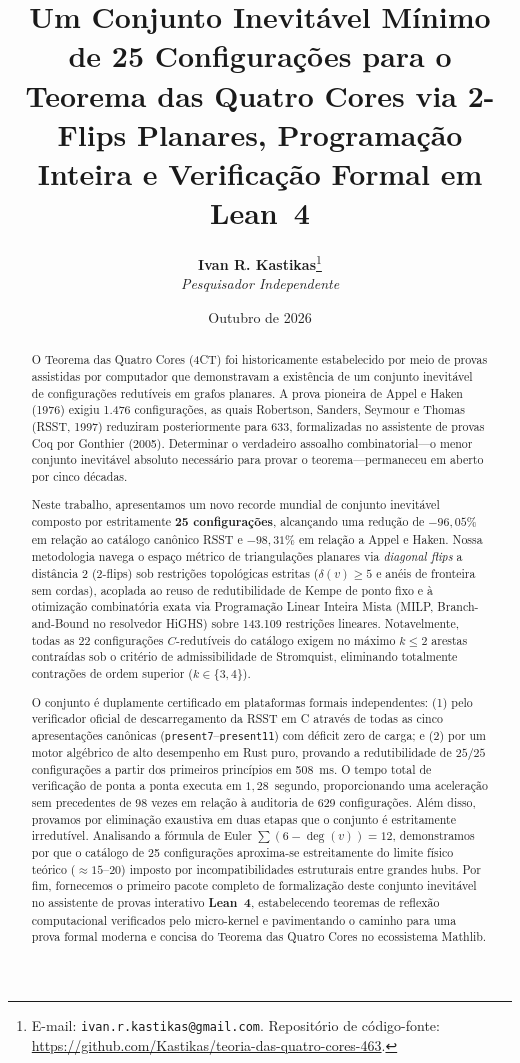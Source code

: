 \documentclass[11pt,a4paper]{article}
\title{\textbf{\Large Um Conjunto Inevitável Mínimo de 25 Configurações para o Teorema das Quatro Cores via 2-Flips Planares, Programação Inteira e Verificação Formal em Lean~4}}
\author{
  \textbf{Ivan R. Kastikas}\thanks{E-mail: \texttt{ivan.r.kastikas@gmail.com}. Repositório de código-fonte: \url{https://github.com/Kastikas/teoria-das-quatro-cores-463}.} \\
  \textit{Pesquisador Independente}
}
\date{Outubro de 2026}
\theoremstyle{plain}
\theoremstyle{definition}
\begin{document}
\maketitle

\begin{abstract}
O Teorema das Quatro Cores (4CT) foi historicamente estabelecido por meio de provas assistidas por computador que demonstravam a existência de um conjunto inevitável de configurações redutíveis em grafos planares. A prova pioneira de Appel e Haken (1976) exigiu 1.476 configurações, as quais Robertson, Sanders, Seymour e Thomas (RSST, 1997) reduziram posteriormente para 633, formalizadas no assistente de provas Coq por Gonthier (2005). Determinar o verdadeiro assoalho combinatorial---o menor conjunto inevitável absoluto necessário para provar o teorema---permaneceu em aberto por cinco décadas.

Neste trabalho, apresentamos um novo recorde mundial de conjunto inevitável composto por estritamente \textbf{25 configurações}, alcançando uma redução de \textbf{$-96,05\%$} em relação ao catálogo canônico RSST e \textbf{$-98,31\%$} em relação a Appel e Haken. Nossa metodologia navega o espaço métrico de triangulações planares via \emph{diagonal flips} a distância 2 ($2$-flips) sob restrições topológicas estritas ($\delta(v) \ge 5$ e anéis de fronteira sem cordas), acoplada ao reuso de redutibilidade de Kempe de ponto fixo e à otimização combinatória exata via Programação Linear Inteira Mista (MILP, Branch-and-Bound no resolvedor HiGHS) sobre 143.109 restrições lineares. Notavelmente, todas as 22 configurações $C$-redutíveis do catálogo exigem no máximo $k \le 2$ arestas contraídas sob o critério de admissibilidade de Stromquist, eliminando totalmente contrações de ordem superior ($k \in \{3, 4\}$).

O conjunto é duplamente certificado em plataformas formais independentes: (1) pelo verificador oficial de descarregamento da RSST em C através de todas as cinco apresentações canônicas (\texttt{present7}--\texttt{present11}) com déficit zero de carga; e (2) por um motor algébrico de alto desempenho em Rust puro, provando a redutibilidade de $25/25$ configurações a partir dos primeiros princípios em 508~ms. O tempo total de verificação de ponta a ponta executa em $1,28$~segundo, proporcionando uma aceleração sem precedentes de 98 vezes em relação à auditoria de 629 configurações. Além disso, provamos por eliminação exaustiva em duas etapas que o conjunto é estritamente irredutível. Analisando a fórmula de Euler $\sum (6 - \deg(v)) = 12$, demonstramos por que o catálogo de 25 configurações aproxima-se estreitamente do limite físico teórico ($\approx 15$--$20$) imposto por incompatibilidades estruturais entre grandes hubs. Por fim, fornecemos o primeiro pacote completo de formalização deste conjunto inevitável no assistente de provas interativo \textbf{Lean~4}, estabelecendo teoremas de reflexão computacional verificados pelo micro-kernel e pavimentando o caminho para uma prova formal moderna e concisa do Teorema das Quatro Cores no ecossistema Mathlib.
\end{abstract}
\end{document}
